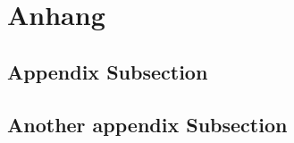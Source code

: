 \documentclass[../main.tex]{subfiles}
\begin{document}
\section*{Anhang}
\appendix
\renewcommand{\thesubsection}{\Alph{subsection}}

\subsection{Appendix Subsection}
\subsection{Another appendix Subsection}
\end{document}
